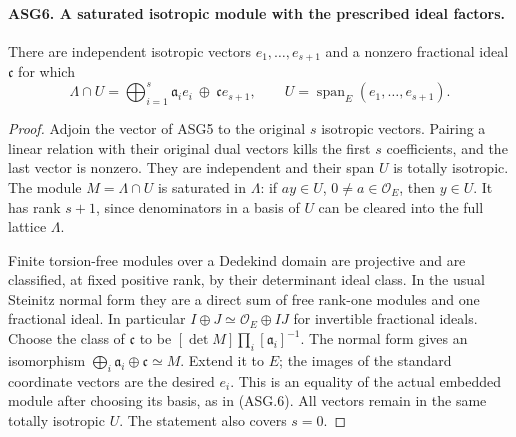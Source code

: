 \paragraph{ASG6. A saturated isotropic module with the prescribed ideal factors.}
\label{claim:ASG6}
There are independent isotropic vectors \(e_1,\ldots,e_{s+1}\)
and a nonzero fractional ideal \(\mathfrak c\) for which
\[
 \Lambda\cap U=\bigoplus_{i=1}^{s}\mathfrak a_i e_i
                             \ \oplus\ \mathfrak c e_{s+1},
 \qquad U=\operatorname{span}_E(e_1,\ldots,e_{s+1}).
\tag{ASG.6}
\]
\begin{proof}
Adjoin the vector of ASG5 to the original \(s\) isotropic
vectors.  Pairing a linear relation with their original dual vectors
kills the first \(s\) coefficients, and the last vector is nonzero.
They are independent and their span \(U\) is totally isotropic.
The module \(M=\Lambda\cap U\) is saturated in \(\Lambda\):
if \(ay\in U\), \(0\ne a\in\mathcal O_E\), then \(y\in U\).
It has rank \(s+1\), since denominators in a basis of \(U\)
can be cleared into the full lattice \(\Lambda\).

Finite torsion-free modules over a Dedekind domain are projective and
are classified, at fixed positive rank, by their determinant ideal
class.  In the usual Steinitz normal form they are a direct sum of
free rank-one modules and one fractional ideal.  In particular
\(I\oplus J\simeq\mathcal O_E\oplus IJ\) for invertible
fractional ideals.  Choose the class of \(\mathfrak c\) to be
\([\det M]\prod_i[\mathfrak a_i]^{-1}\).
The normal form gives an isomorphism
\(\bigoplus_i\mathfrak a_i\oplus\mathfrak c\simeq M\).
Extend it to \(E\); the images of the standard coordinate vectors
are the desired \(e_i\).  This is an equality of the actual
embedded module after choosing its basis, as in (ASG.6).
All vectors remain in the same totally isotropic \(U\).
The statement also covers \(s=0\).
\end{proof}

